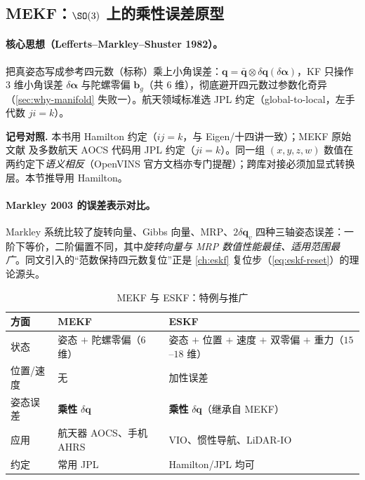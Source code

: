 \subsection{MEKF：\texorpdfstring{$\SO(3)$}{SO(3)} 上的乘性误差原型}
\label{subsec:mekf}

\paragraph{核心思想（Lefferts--Markley--Shuster 1982）。}
把真姿态写成参考四元数（标称）乘上小角误差\cite{lefferts1982kalman}：$\mathbf{q}=\bar{\mathbf{q}}\otimes\delta\mathbf{q}(\delta\boldsymbol{\alpha})$，KF 只操作 $3$ 维小角误差 $\delta\boldsymbol{\alpha}$ 与陀螺零偏 $\mathbf{b}_g$（共 $6$ 维），彻底避开四元数过参数化奇异（\cref{sec:why-manifold} 失败一）。航天领域标准选 JPL 约定（global-to-local，左手代数 $ji=k$）。

\begin{note}
\textbf{记号对照.}\;
本书用 Hamilton 约定（$ij=k$，与 Eigen/十四讲一致）；MEKF 原始文献\cite{lefferts1982kalman} 及多数航天 AOCS 代码用 JPL 约定（$ji=k$）。同一组 $(x,y,z,w)$ 数值在两约定下\emph{语义相反}（OpenVINS 官方文档亦专门提醒）；跨库对接必须加显式转换层。本节推导用 Hamilton。
\end{note}

\paragraph{Markley 2003 的误差表示对比。}
Markley 系统比较了旋转向量、Gibbs 向量、MRP、$2\delta\mathbf{q}_v$ 四种三轴姿态误差\cite{markley2003attitude}：一阶下等价，二阶偏置不同，其中\emph{旋转向量与 MRP 数值性能最佳、适用范围最广}。同文引入的“范数保持四元数复位”正是 \cref{ch:eskf} 复位步（\cref{eq:eskf-reset}）的理论源头。

\begin{table}[H]\centering\small
\caption{MEKF 与 ESKF：特例与推广}
\label{tab:mekf-eskf}
\begin{tabular}{lll}
\toprule
方面 & MEKF & ESKF \\
\midrule
状态 & 姿态 $+$ 陀螺零偏（$6$ 维） & 姿态 $+$ 位置 $+$ 速度 $+$ 双零偏 $+$ 重力（$15$--$18$ 维） \\
位置/速度 & 无 & 加性误差 \\
姿态误差 & \textbf{乘性} $\delta\mathbf{q}$ & \textbf{乘性} $\delta\mathbf{q}$（继承自 MEKF） \\
应用 & 航天器 AOCS、手机 AHRS & VIO、惯性导航、LiDAR-IO \\
约定 & 常用 JPL & Hamilton/JPL 均可 \\
\bottomrule
\end{tabular}
\end{table}

